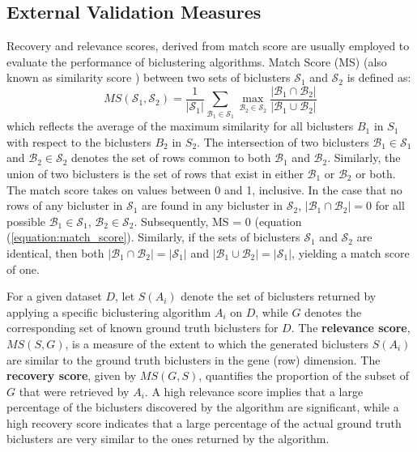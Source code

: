 \subsection{External Validation Measures}
Recovery and relevance scores, derived from  match score \cite{prelic2006systematic} are usually employed to evaluate the performance of biclustering algorithms.
Match Score (MS) (also known as similarity score \cite{wang2016unibic}) between two sets of biclusters $\mathcal{S}_1$ and $\mathcal{S}_2$  is defined as:
\begin{equation} \label{equation:match_score}
	MS\left(\mathcal{S}_1, \mathcal{S}_2\right) =
    	\frac{1}{\lvert \mathcal{S}_1 \rvert} \sum_{\mathcal{B}_1 \in \mathcal{S}_1} \max_{\mathcal{B}_2 \in \mathcal{S}_2} \frac{\lvert \mathcal{B}_1 \cap \mathcal{B}_2 \rvert}{\lvert \mathcal{B}_1 \cup \mathcal{B}_2 \rvert}
\end{equation}
which reflects the average of the maximum similarity for all
biclusters $B_1$ in $S_1$ with respect to the biclusters $B_2$ in $S_2$. The intersection of two biclusters $\mathcal{B}_1 \in \mathcal{S}_1$ and $\mathcal{B}_2 \in \mathcal{S}_2$ denotes the set of rows common to both $\mathcal{B}_1$ and $\mathcal{B}_2$. Similarly, the union of two biclusters is the set of rows that exist in either $\mathcal{B}_1$ or $\mathcal{B}_2$ or both.
The match score takes on values between 0 and 1, inclusive. In the case that no rows of any bicluster in $\mathcal{S}_1$ are found in any bicluster in $\mathcal{S}_2$, $\lvert \mathcal{B}_1 \cap \mathcal{B}_2 \rvert = 0$ for all possible $\mathcal{B}_1 \in \mathcal{S}_1$, $\mathcal{B}_2 \in \mathcal{S}_2$. Subsequently, MS = 0 (equation (\ref{equation:match_score}). Similarly, if the sets of biclusters $\mathcal{S}_1$ and $\mathcal{S}_2$ are identical, then both $\lvert \mathcal{B}_1 \cap \mathcal{B}_2 \rvert = \lvert \mathcal{S}_1 \rvert$ and $\lvert \mathcal{B}_1 \cup \mathcal{B}_2 \rvert = \lvert \mathcal{S}_1 \rvert$, yielding a match score of one. 

For a given dataset $D$, let $S(A_i)$ denote the set of biclusters returned by applying a specific biclustering algorithm $A_i$ on $D$,  while $G$ denotes the corresponding set of known ground truth biclusters for $D$. The \textbf{relevance score}, $MS(S, G)$, is a measure of the extent to which the generated biclusters $S(A_i)$ are similar to the ground truth biclusters in the gene (row) dimension. The \textbf{recovery score}, given by $MS(G, S)$, quantifies the proportion of the subset of $G$ that were retrieved by $A_i$. A high relevance score implies that a large percentage of the biclusters discovered by the algorithm are significant, while a high recovery score indicates that a large percentage of the actual ground truth biclusters are very similar to the ones returned by the algorithm. 

